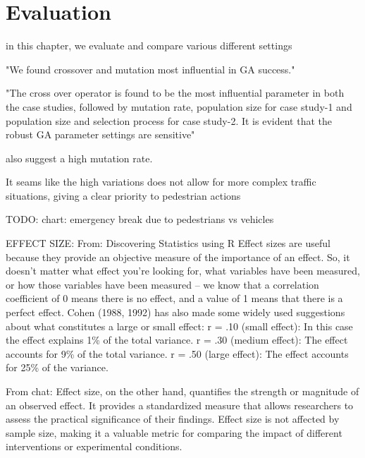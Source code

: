 \chapter{Evaluation}
\label{chap:evaluation}
in this chapter, we evaluate and compare various different settings

"We found crossover and mutation most influential in GA success."\cite{mills_determining_2015}

"The cross over operator is found to be the most influential parameter in both the case studies, followed by mutation rate, population size for case study-1 and population size and selection process for case study-2. It is evident that the robust GA parameter settings are sensitive"\cite{majumdar_genetic_2015}

\cite{boyabatli_parameter_2004} also suggest a high mutation rate.



It seams like the high variations does not allow for more complex traffic situations, giving a clear priority to pedestrian actions

TODO: chart: emergency break due to pedestrians vs vehicles









EFFECT SIZE:
From: Discovering Statistics using R
Effect sizes are useful because they provide an objective measure of the importance of an effect. So, it doesn’t matter what effect you’re looking for, what variables have been measured, or how those variables have been measured – we know that a correlation coefficient of 0 means there is no effect, and a value of 1 means that there is a perfect effect.
Cohen (1988, 1992) has also made some widely used suggestions about what constitutes a large or small effect: 
r = .10 (small effect): In this case the effect explains 1\% of the total variance. 
r = .30 (medium effect): The effect accounts for 9\% of the total variance. 
r = .50 (large effect): The effect accounts for 25\% of the variance.


From chat: 
Effect size, on the other hand, quantifies the strength or magnitude of an observed effect. It provides a standardized measure that allows researchers to assess the practical significance of their findings.
Effect size is not affected by sample size, making it a valuable metric for comparing the impact of different interventions or experimental conditions.

